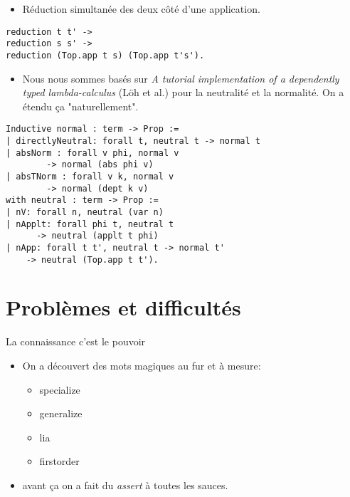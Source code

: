 \documentclass{beamer}
\begin{document}
\begin{frame}[fragile]
\begin{itemize}
\item Réduction simultanée des deux côté d'une application.
\pause
\end{itemize}
\begin{verbatim}
reduction t t' ->
reduction s s' ->
reduction (Top.app t s) (Top.app t's').
\end{verbatim}
\pause
\begin{itemize}
\item Nous nous sommes basés sur \emph{A tutorial implementation of a
dependently typed lambda-calculus} (Löh et al.) pour la neutralité et la
normalité. On a étendu ça "naturellement".
\end{itemize}
\end{frame}

\begin{frame}[fragile]
\begin{verbatim}
Inductive normal : term -> Prop :=
| directlyNeutral: forall t, neutral t -> normal t
| absNorm : forall v phi, normal v 
		-> normal (abs phi v)
| absTNorm : forall v k, normal v 
		-> normal (dept k v)
with neutral : term -> Prop :=
| nV: forall n, neutral (var n)
| nApplt: forall phi t, neutral t 
	  -> neutral (applt t phi)
| nApp: forall t t', neutral t -> normal t' 
	-> neutral (Top.app t t').
\end{verbatim}
\end{frame}

\section{Problèmes et difficultés}

\begin{frame}{La connaissance c'est le pouvoir}
\begin{itemize}
\item On a découvert des mots magiques au fur et à mesure:
\pause
\begin{itemize}
\item specialize
\item generalize
\item lia
\item firstorder
\end{itemize}
\pause
\item avant ça on a fait du \emph{assert} à toutes les sauces.
\end{itemize}
\end{frame}
\end{document}
